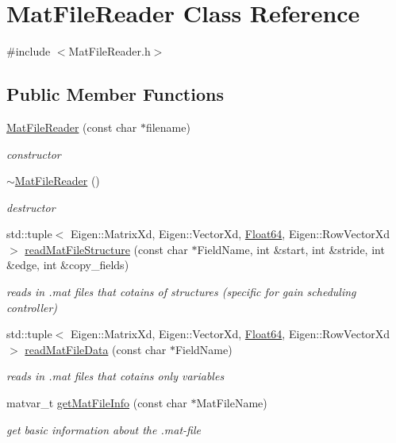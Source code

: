\hypertarget{class_mat_file_reader}{}\section{Mat\+File\+Reader Class Reference}
\label{class_mat_file_reader}


{\ttfamily \#include $<$Mat\+File\+Reader.\+h$>$}

\subsection*{Public Member Functions}
\begin{DoxyCompactItemize}
\item 
\hyperlink{class_mat_file_reader_aad136aff8215618eff5e3390b374e61a}{Mat\+File\+Reader} (const char $\ast$filename)
\begin{DoxyCompactList}\small\item\em constructor \end{DoxyCompactList}\item 
\hyperlink{class_mat_file_reader_a823b7d4b2d83c79d92a7936fe0db39c7}{$\sim$\+Mat\+File\+Reader} ()
\begin{DoxyCompactList}\small\item\em destructor \end{DoxyCompactList}\item 
std\+::tuple$<$ Eigen\+::\+Matrix\+Xd, Eigen\+::\+Vector\+Xd, \hyperlink{group___tools_ga3f1431cb9f76da10f59246d1d743dc2c}{Float64}, Eigen\+::\+Row\+Vector\+Xd $>$ \hyperlink{class_mat_file_reader_a348e33866c02d6bfe3be63ad34871025}{read\+Mat\+File\+Structure} (const char $\ast$Field\+Name, int \&start, int \&stride, int \&edge, int \&copy\+\_\+fields)
\begin{DoxyCompactList}\small\item\em reads in .mat files that cotains of structures (specific for gain scheduling controller) \end{DoxyCompactList}\item 
std\+::tuple$<$ Eigen\+::\+Matrix\+Xd, Eigen\+::\+Vector\+Xd, \hyperlink{group___tools_ga3f1431cb9f76da10f59246d1d743dc2c}{Float64}, Eigen\+::\+Row\+Vector\+Xd $>$ \hyperlink{class_mat_file_reader_ab5269caf1a7e2c213f6daf56c7d14321}{read\+Mat\+File\+Data} (const char $\ast$Field\+Name)
\begin{DoxyCompactList}\small\item\em reads in .mat files that cotains only variables \end{DoxyCompactList}\item 
matvar\+\_\+t \hyperlink{class_mat_file_reader_a358cf61a557c68d56a2ee9f23773e46c}{get\+Mat\+File\+Info} (const char $\ast$Mat\+File\+Name)
\begin{DoxyCompactList}\small\item\em get basic information about the .mat-\/file \end{DoxyCompactList}\end{DoxyCompactItemize}


